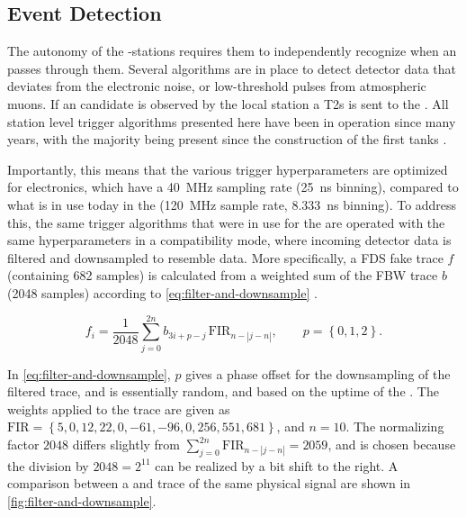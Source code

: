 \subsection{Event Detection}
\label{ssec:sd-triggers}

The autonomy of the \SD-stations requires them to independently recognize when
an \EAS passes through them. Several algorithms are in place to detect detector
data that deviates from the electronic noise, or low-threshold pulses from 
atmospheric muons. If an \EAS candidate is observed by the local station a 
\acfp{T2} is sent to the \CDAS. All station level trigger algorithms presented 
here have been in operation since many years, with the majority being present 
since the construction of the first \WCD tanks 
\cite{thepierreaugercollaborationPierreAugerObservatory1997}. 

Importantly, this means that the various trigger hyperparameters are optimized 
for \UB electronics, which have a \SI{40}{\mega\hertz} sampling rate 
(\SI{25}{\nano\second} binning), compared to what is in use today in the \UUB 
(\SI{120}{\mega\hertz} sample rate, \SI{8.333}{\nano\second} binning). To 
address this, the same trigger algorithms that were in use for the \UB are 
operated with the same hyperparameters in a compatibility mode, where incoming 
\UUB detector data is filtered and downsampled to resemble \UB data. More 
specifically, a \acf{FDS} fake \UB trace $f$ (containing 682 samples) is 
calculated from a weighted sum of the \acf{FBW} trace $b$ (2048 samples) 
according to \cref{eq:filter-and-downsample} 
\cite{convengaLocalStationCalibrationDummies2023}.

\begin{equation}
\label{eq:filter-and-downsample} 
f_i = \frac{1}{2048} \sum^{2 n}_{j = 0} b_{3i+p-j} \, \mathrm{FIR}_{n - \left| j-n \right|}, \qquad p = \left\{ 0, 1, 2 \right\}.
\end{equation}

In \cref{eq:filter-and-downsample}, $p$ gives a phase offset for the 
downsampling of the filtered trace, and is essentially random, and based on the
uptime of the \FPGA. The \FIR weights applied to the \FBW trace are given as
$\mathrm{FIR} = \left\{ 5, 0, 12, 22, 0, -61, -96, 0, 256, 551, 681 \right\}$, 
and $n=10$. The normalizing factor $2048$ differs slightly from 
$\sum^{2n}_{j=0} \mathrm{FIR}_{n-\left| j-n \right|} = 2059$, and is chosen 
because the division by $2048 = 2^{11}$ can be realized by a bit shift to the 
right. A comparison between a \FBW and \FDS trace of the same physical signal 
are shown in \cref{fig:filter-and-downsample}.

